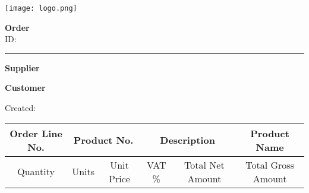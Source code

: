 \documentclass[12pt]{article}
\begin{document}
\noindent
\begin{minipage}{0.48\textwidth}
    \texttt{[image: logo.png]} %
\end{minipage}
\hfill
\begin{minipage}{0.48\textwidth}
    \raggedleft
    {\Large\textbf{Order}}\\
    {\large ID: }%
\end{minipage}

\vspace{1cm}
\noindent\rule{\textwidth}{1pt}
\vspace{1cm}
\begin{minipage}[t]{0.48\textwidth}
    \textbf{Supplier}\\
\end{minipage}
\hfill
\begin{minipage}[t]{0.48\textwidth}
    \textbf{Customer}\\
\end{minipage}

\noindent Created: %
\vspace{1cm}

\begin{table}[h]
\centering
\begin{tabular}{|c|c|c|c|c|c|}
\hline
\multicolumn{1}{|c|}{Order Line No.} & \multicolumn{2}{c|}{Product No.} & \multicolumn{2}{c|}{Description} & {Product Name} \\
\hline
Quantity & Units & Unit Price & VAT \% & Total Net Amount & Total Gross Amount \\
\hline
\end{tabular}
\end{table}

\noindent\hfill{}
\end{document}
